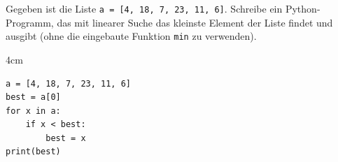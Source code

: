 \question[3]
Gegeben ist die Liste \texttt{a = [4, 18, 7, 23, 11, 6]}. 
Schreibe ein Python-Programm, das mit linearer Suche das kleinste Element der Liste 
findet und ausgibt (ohne die eingebaute Funktion \texttt{min} zu verwenden).

\begin{solutionbox}{4cm}
\begin{lstlisting}
a = [4, 18, 7, 23, 11, 6]
best = a[0]
for x in a:
    if x < best:
        best = x
print(best)
\end{lstlisting}
\end{solutionbox}